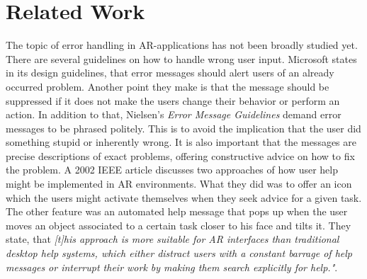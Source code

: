 \documentclass[11pt, a4paper]{article}
\begin{document}
	\section*{Related Work}\label{sec:relatedwork}
		The topic of error handling in \ac{AR}-applications has not been broadly studied yet. There are several guidelines on how to handle wrong user input. Microsoft states in its design guidelines, that error messages should alert users of an already occurred problem. Another point they make is that the message should be suppressed if it does not make the users change their behavior or perform an action\cite{Microsoft}. In addition to that, Nielsen's \textit{Error Message Guidelines} demand error messages to be phrased politely. This is to avoid the implication that the user did something stupid or inherently wrong. It is also important that the messages are precise descriptions of exact problems, offering constructive advice on how to fix the problem\cite{Nielsen2001}. A 2002 IEEE article discusses two approaches of how user help might be implemented in \ac{AR} environments. What they did was to offer an icon which the users might activate themselves when they seek advice for a given task. The other feature was an automated help message that pops up when the user moves an object associated to a certain task closer to his face and tilts it. They state, that \textit{\textnormal{[t]}his approach is more suitable for AR interfaces than traditional desktop help systems, which either distract users with a constant barrage of help messages or interrupt their work by making them search explicitly for help."}\cite{IEEE2002}.	
\end{document}
